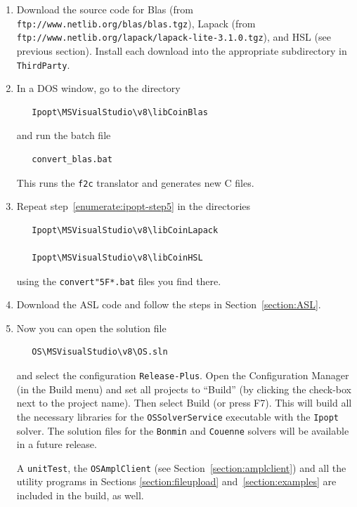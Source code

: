 \documentclass[11pt]{article}
\renewcommand{\_}{{\char"5F}}
\renewcommand{\{}{{\char"7B}}
\renewcommand{\}}{{\char"7D}}
\renewcommand{\^}{{\char"0D}}
\renewcommand{\'}{{\char"0D}}
\newcommand{\UrlBlas}{ftp://www.netlib.org/blas/blas.tgz}
\newcommand{\UrlLapack}{ftp://www.netlib.org/lapack/lapack-lite-3.1.0.tgz}
\begin{document}
\begin{enumerate}
\item{} Download the source code for Blas (from {\tt\UrlBlas}),
Lapack (from {\tt\UrlLapack}),
and HSL (see previous section).
Install each download into the appropriate subdirectory in {\tt ThirdParty}.

\item{} \label{enumerate:ipopt-step5}
In a DOS window, go to the directory

\begin{verbatim}
   Ipopt\MSVisualStudio\v8\libCoinBlas
\end{verbatim}

   and run the batch file

\begin{verbatim}
   convert_blas.bat
\end{verbatim}

   This runs the {\tt f2c} translator and generates new C files.%


\item{} Repeat step~\ref{enumerate:ipopt-step5} in the directories

\begin{verbatim}
   Ipopt\MSVisualStudio\v8\libCoinLapack

   Ipopt\MSVisualStudio\v8\libCoinHSL
\end{verbatim}

   using the {\tt convert\_*.bat} files you find there.

\item{}
   Download the ASL code and follow the steps in Section~\ref{section:ASL}.

\item{}
Now you can open the solution file

\begin{verbatim}
   OS\MSVisualStudio\v8\OS.sln
\end{verbatim}

and select the configuration {\tt Release-Plus}.
Open the Configuration Manager (in the Build menu)
and set all projects to ``Build''
(by clicking the check-box next to the project name).
Then select Build (or press F7).
This will build all the necessary libraries for the
{\tt OSSolverService} executable
with the {\tt Ipopt} solver. The solution files for the {\tt Bonmin} 
and {\tt Couenne} solvers will be
available in a future release.

A {\tt unitTest},
the {\tt OSAmplClient} (see Section~\ref{section:amplclient})
and all the utility programs in Sections \ref{section:fileupload}
and~\ref{section:examples} are included in the build, as well.
\end{enumerate}
\end{document}
